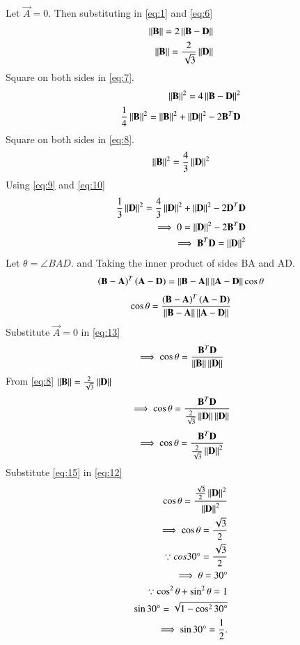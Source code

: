 \documentclass[journal,12pt,twocolumn]{IEEEtran}
\begin{document}
Let $\vec{A}=0$. Then substituting in \eqref{eq:1} and \eqref{eq:6}
\begin{align}
    \label{eq:7}\left\lVert\mathbf{B}\right\rVert=2\left\lVert\mathbf{B-D}\right\rVert\\
    \label{eq:8}\left\lVert\mathbf{B}\right\rVert=\frac{2}{\sqrt{3}}\left\lVert\mathbf{D}\right\rVert
\end{align}
Square on both sides in \eqref{eq:7}.
\begin{align}
    \left\lVert\mathbf{B}\right\rVert^2=4\left\lVert\mathbf{B-D}\right\rVert^2\\
    \frac{1}{4}\left\lVert\mathbf{B}\right\rVert^2=\left\lVert\mathbf{B}\right\rVert^2+\left\lVert\mathbf{D}\right\rVert^2-2\mathbf{B}^T\mathbf{D}\label{eq:9}
\end{align}
Square on both sides in \eqref{eq:8}.
\begin{align}
\left\lVert\mathbf{B}\right\rVert^2 = \frac{4}{3}\left\lVert\mathbf{D}\right\rVert^2\label{eq:10}
\end{align}
Using \eqref{eq:9} and \eqref{eq:10}
\begin{align}
    \frac{1}{3}\left\lVert\mathbf{D}\right\rVert^2=\frac{4}{3}\left\lVert\mathbf{D}\right\rVert^2+\left\lVert\mathbf{D}\right\rVert^2-2\mathbf{D}^T\mathbf{D}\\
    \implies0=\left\lVert\mathbf{D}\right\rVert^2-2\mathbf{B}^T\mathbf{D}\\
     \implies\mathbf{B}^T\mathbf{D}=\left\lVert\mathbf{D}\right\rVert^2\label{eq:15}
\end{align}
Let $\theta=\angle BAD$. and Taking the inner product of sides BA and AD.
\begin{align}
    \left(\mathbf{B}-\mathbf{A}\right)^T\left(\mathbf{A}-\mathbf{D}\right) =
    \left\lVert\mathbf{B}-\mathbf{A}\right\rVert\left\lVert\mathbf{A}-\mathbf{D}\right\rVert\cos{\theta}
\end{align}
\begin{align}
    \cos{\theta}=\frac{\left(\mathbf{B}-\mathbf{A}\right)^T\left(\mathbf{A}-\mathbf{D}\right)}{\left\lVert\mathbf{B}-\mathbf{A}\right\rVert\left\lVert\mathbf{A}-\mathbf{D}\right\rVert}\label{eq:13}
\end{align}
Substitute $\vec{A}=0$ in \eqref{eq:13}
\begin{align}
    \label{eq:12}\implies\cos{\theta}=\frac{\mathbf{B}^T\mathbf{D}}{\left\lVert\mathbf{B}\right\rVert\left\lVert\mathbf{D}\right\rVert}
\end{align}
From \eqref{eq:8} $\left\lVert\mathbf{B}\right\rVert=\frac{2}{\sqrt{3}}\left\lVert\mathbf{D}\right\rVert$
\begin{align}
     \label{eq:12}\implies\cos{\theta}=\frac{\mathbf{B}^T\mathbf{D}}{\frac{2}{\sqrt{3}}\left\lVert\mathbf{D}\right\rVert\left\lVert\mathbf{D}\right\rVert}
\end{align}
\begin{align}
\label{eq:12}\implies\cos{\theta}=\frac{\mathbf{B}^T\mathbf{D}}{\frac{2}{\sqrt{3}}\left\lVert\mathbf{D}\right\rVert^2}
\end{align}
Substitute \eqref{eq:15} in \eqref{eq:12}
\begin{align}
\cos\theta = \frac{{\frac{\sqrt{3}}{2}\left\lVert\mathbf{D}\right\rVert^2}}{\left\lVert\mathbf{D}\right\rVert^2}\\
    \implies\cos\theta=\frac{\sqrt{3}}{2}\\
    \because cos30\degree = \frac{\sqrt{3}}{2}\\
    \implies\theta = 30\degree\\
    \because \cos^2\theta +\sin^2\theta = 1\\
     \sin30\degree = \sqrt{1-\cos^230\degree}\\
    \implies\sin30\degree = \frac{1}{2}.
\end{align} 
\end{document}
